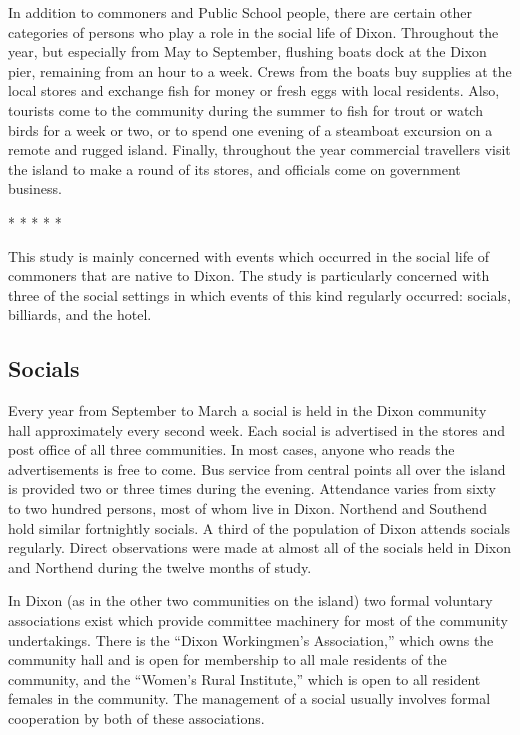 \documentclass[twoside,symmetric,nobib,justified]{tufte-book}
\begin{document}
In addition to commoners and Public School people, there are certain
other categories of persons who play a role in the social life of Dixon.
Throughout the year, but especially from May to September, flushing
boats dock at the Dixon pier, remaining from an hour to a week. Crews
from the boats buy supplies at the local stores and exchange fish for
money or fresh eggs with local residents. Also, tourists come to the
community during the summer to fish for trout or watch birds for a week
or two, or to spend one evening of a steamboat excursion on a remote and
rugged island. Finally, throughout the year commercial travellers visit
the island to make a round of its stores, and officials come on
government business.

\vspace{.2in}
\begin{centering}

\Large{* * * * *}

\end{centering}
\vspace{.17in}

\noindent This study is mainly concerned with events which occurred in the social
life of commoners that are native to Dixon. The study is particularly
concerned with three of the social settings in which events of this kind
regularly occurred: socials, billiards, and the hotel.

\hypertarget{socials}{%
\subsection{Socials}\label{socials}}

Every year from September to March a social is held in the Dixon
community hall approximately every second week. Each social is
advertised in the stores and post office of all three communities. In
most cases, anyone who reads the advertisements is free to come. Bus
service from central points all over the island is provided two or three
times during the evening. Attendance varies from sixty to two hundred
persons, most of whom live in Dixon. Northend and Southend hold similar
fortnightly socials. A third of the population of Dixon attends socials
regularly. Direct observations were made at almost all of the socials
held in Dixon and Northend during the twelve months of study.

In Dixon (as in the other two communities on the island) two formal
voluntary associations exist which provide committee machinery for most
of the community undertakings. There is the ``Dixon Workingmen's
Association,'' which owns the community hall and is open for membership
to all male residents of the community, and the ``Women's Rural
Institute,'' which is open to all resident females in the community. The
management of a social usually involves formal cooperation by both of
these associations.
\end{document}
